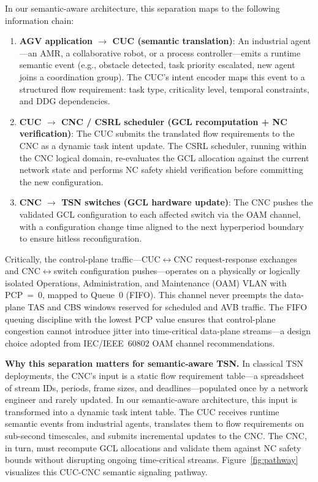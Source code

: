 \documentclass[conference]{IEEEtran}
\begin{document}
In our semantic-aware architecture, this separation maps to the following information chain:
\begin{enumerate}
\item \textbf{AGV application $\rightarrow$ CUC (semantic translation)}: An industrial agent---an AMR, a collaborative robot, or a process controller---emits a runtime semantic event (e.g., obstacle detected, task priority escalated, new agent joins a coordination group). The CUC's intent encoder maps this event to a structured flow requirement: task type, criticality level, temporal constraints, and DDG dependencies.
\item \textbf{CUC $\rightarrow$ CNC / CSRL scheduler (GCL recomputation + NC verification)}: The CUC submits the translated flow requirements to the CNC as a dynamic task intent update. The CSRL scheduler, running within the CNC logical domain, re-evaluates the GCL allocation against the current network state and performs NC safety shield verification before committing the new configuration.
\item \textbf{CNC $\rightarrow$ TSN switches (GCL hardware update)}: The CNC pushes the validated GCL configuration to each affected switch via the OAM channel, with a configuration change time aligned to the next hyperperiod boundary to ensure hitless reconfiguration.
\end{enumerate}

Critically, the control-plane traffic---CUC$\leftrightarrow$CNC request-response exchanges and CNC$\leftrightarrow$switch configuration pushes---operates on a physically or logically isolated Operations, Administration, and Maintenance (OAM) VLAN with PCP~=~0, mapped to Queue~0 (FIFO). This channel never preempts the data-plane TAS and CBS windows reserved for scheduled and AVB traffic. The FIFO queuing discipline with the lowest PCP value ensures that control-plane congestion cannot introduce jitter into time-critical data-plane streams---a design choice adopted from IEC/IEEE~60802 OAM channel recommendations.

\textbf{Why this separation matters for semantic-aware TSN.} In classical TSN deployments, the CNC's input is a static flow requirement table---a spreadsheet of stream IDs, periods, frame sizes, and deadlines---populated once by a network engineer and rarely updated. In our semantic-aware architecture, this input is transformed into a dynamic task intent table. The CUC receives runtime semantic events from industrial agents, translates them to flow requirements on sub-second timescales, and submits incremental updates to the CNC. The CNC, in turn, must recompute GCL allocations and validate them against NC safety bounds without disrupting ongoing time-critical streams. Figure~\ref{fig:pathway} visualizes this CUC-CNC semantic signaling pathway.
\end{document}
